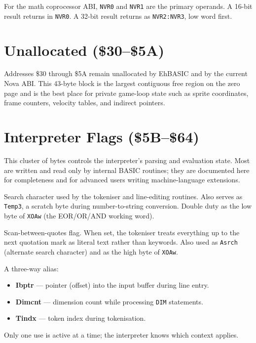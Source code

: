 For the math coprocessor ABI, \texttt{NVR0} and \texttt{NVR1} are the primary
operands.  A 16-bit result returns in \texttt{NVR0}.  A 32-bit result returns
as \texttt{NVR2:NVR3}, low word first.

\section{Unallocated (\$30--\$5A)}

Addresses \$30 through \$5A remain unallocated by EhBASIC and by the current
Nova ABI.  This 43-byte block is the largest contiguous free region on the
zero page and is the best place for private game-loop state such as sprite
coordinates, frame counters, velocity tables, and indirect pointers.

\section{Interpreter Flags (\$5B--\$64)}

This cluster of bytes controls the interpreter's parsing and evaluation state.
Most are written and read only by internal BASIC routines; they are documented
here for completeness and for advanced users writing machine-language
extensions.


Search character used by the tokeniser and line-editing routines.  Also serves
as \texttt{Temp3}, a scratch byte during number-to-string conversion.  Double
duty as the low byte of \texttt{XOAw} (the EOR/OR/AND working word).


Scan-between-quotes flag.  When set, the tokeniser treats everything up to the
next quotation mark as literal text rather than keywords.  Also used as
\texttt{Asrch} (alternate search character) and as the high byte of
\texttt{XOAw}.


A three-way alias:
\begin{itemize}
  \item \textbf{Ibptr} --- pointer (offset) into the input buffer during line entry.
  \item \textbf{Dimcnt} --- dimension count while processing \texttt{DIM} statements.
  \item \textbf{Tindx} --- token index during tokenisation.
\end{itemize}
Only one use is active at a time; the interpreter knows which context applies.


